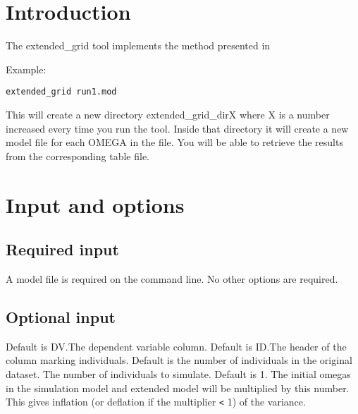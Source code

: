 

\usepackage{hyperref}


\maketitle
\newcommand{\guidetoolname}{extended\_grid}
\tableofcontents
\newpage

\section{Introduction}
The extended\_grid tool implements the method presented in \cite{Savic}

Example:
\begin{verbatim}
extended_grid run1.mod
\end{verbatim}

This will create a new directory extended\_grid\_dirX where X is a number increased every time you run the tool. Inside that
directory it will create a new model file for each OMEGA in the file. You will be able to retrieve the results from the
corresponding table file.

\section{Input and options}

\subsection{Required input}
A model file is required on the command line. No other options are required.
	
\subsection{Optional input}	
\begin{optionlist}
Default is DV.The dependent variable column.  
\nextopt
{}
Default is ID.The header of the column marking individuals. 
\nextopt
{}
Default is the number of individuals in the original dataset. The number of individuals to simulate.  
\nextopt
{}
Default is 1. The initial omegas in the simulation model and extended model will be multiplied by this number. This gives inflation (or deflation if the multiplier \verb|<| 1) of the variance.
\nextopt
\end{optionlist}

